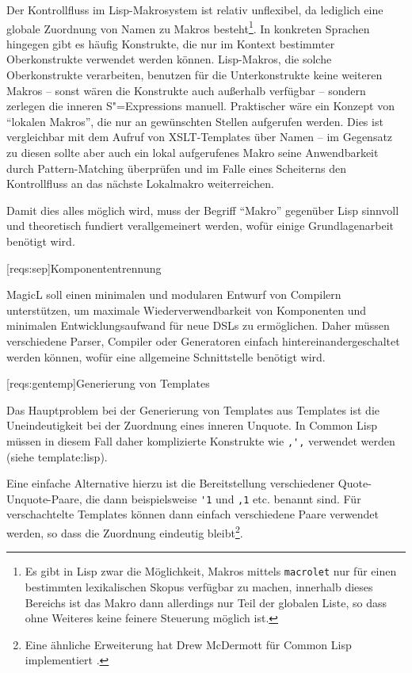 \documentclass[11pt, a4paper, bibgerm]{scrbook}
\newcommand\icode[1]{\lstinline?#1?}
\newcommand\lsection{}
\newcommand\sref{}
\newcommand{\sees}[1]{(siehe \sref{#1})}
\newcommand{\sexps}{S"=Expressions}
\begin{document}
Der Kontrollfluss im Lisp-Makrosystem ist relativ unflexibel,
da lediglich eine globale Zuordnung von Namen zu Makros
besteht\footnote{Es gibt in Lisp zwar die Möglichkeit, Makros mittels
  \icode{macrolet} nur für einen bestimmten lexikalischen Skopus
  verfügbar zu machen, innerhalb dieses Bereichs ist das Makro dann
  allerdings nur Teil der globalen Liste, so dass ohne Weiteres keine
  feinere Steuerung möglich ist.}. In konkreten Sprachen hingegen gibt
es häufig Konstrukte, die nur im Kontext bestimmter Oberkonstrukte
verwendet werden können. Lisp-Makros, die solche Oberkonstrukte
verarbeiten, benutzen für die Unterkonstrukte keine weiteren Makros --
sonst wären die Konstrukte auch außerhalb verfügbar -- sondern zerlegen
die inneren \sexps{} manuell. Praktischer wäre ein Konzept von "`lokalen
Makros"', die nur an gewünschten Stellen aufgerufen werden. Dies ist
vergleichbar mit dem Aufruf von XSLT-Templates über Namen -- im Gegensatz
zu diesen sollte aber auch ein lokal aufgerufenes Makro seine
Anwendbarkeit durch Pattern-Matching überprüfen und im Falle eines
Scheiterns den Kontrollfluss an das nächste Lokalmakro weiterreichen.

Damit dies alles möglich wird, muss der Begriff ``Makro'' gegenüber Lisp
sinnvoll und theoretisch fundiert verallgemeinert werden, wofür einige
Grundlagenarbeit benötigt wird.

\lsection[reqs:sep]{Komponententrennung}

MagicL soll einen minimalen und modularen Entwurf von Compilern
unterstützen, um maximale Wiederverwendbarkeit von Komponenten und
minimalen Entwicklungsaufwand für neue DSLs zu ermöglichen. Daher müssen
verschiedene Parser, Compiler oder Generatoren einfach
hintereinandergeschaltet werden können, wofür eine allgemeine
Schnittstelle benötigt wird.

\lsection[reqs:gentemp]{Generierung von Templates}

Das Hauptproblem bei der Generierung von Templates aus Templates ist die
Uneindeutigkeit bei der Zuordnung eines inneren Unquote. In Common Lisp
müssen in diesem Fall daher komplizierte Konstrukte wie \icode{,',}
verwendet werden \sees{template:lisp}. 

Eine einfache Alternative hierzu ist die Bereitstellung verschiedener
Quote-Unquote-Paare, die dann beispielsweise \icode{'1} und \icode{,1}
etc. benannt sind. Für verschachtelte Templates können dann einfach
verschiedene Paare verwendet werden, so dass die Zuordnung eindeutig
bleibt\footnote{Eine ähnliche Erweiterung hat Drew McDermott für
Common Lisp implementiert \cite[S.21ff]{YTools}.}. 
\end{document}
